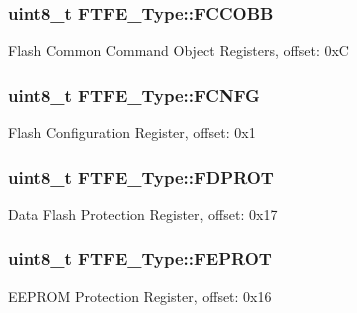 \subsubsection[{\texorpdfstring{F\+C\+C\+O\+BB}{FCCOBB}}]{ uint8\+\_\+t F\+T\+F\+E\+\_\+\+Type\+::\+F\+C\+C\+O\+BB}\hypertarget{structFTFE__Type_af938a39bf6c043725f0bd91484deddbe}{}\label{structFTFE__Type_af938a39bf6c043725f0bd91484deddbe}
Flash Common Command Object Registers, offset\+: 0xC 
\subsubsection[{\texorpdfstring{F\+C\+N\+FG}{FCNFG}}]{ uint8\+\_\+t F\+T\+F\+E\+\_\+\+Type\+::\+F\+C\+N\+FG}\hypertarget{structFTFE__Type_a82c4d1d40ee6da2a49470433428137da}{}\label{structFTFE__Type_a82c4d1d40ee6da2a49470433428137da}
Flash Configuration Register, offset\+: 0x1 
\subsubsection[{\texorpdfstring{F\+D\+P\+R\+OT}{FDPROT}}]{ uint8\+\_\+t F\+T\+F\+E\+\_\+\+Type\+::\+F\+D\+P\+R\+OT}\hypertarget{structFTFE__Type_abf8b7f6db36091a762d7602c079beed9}{}\label{structFTFE__Type_abf8b7f6db36091a762d7602c079beed9}
Data Flash Protection Register, offset\+: 0x17 
\subsubsection[{\texorpdfstring{F\+E\+P\+R\+OT}{FEPROT}}]{ uint8\+\_\+t F\+T\+F\+E\+\_\+\+Type\+::\+F\+E\+P\+R\+OT}\hypertarget{structFTFE__Type_a1f8feee14e02b9d98733f9e8ffb1d93c}{}\label{structFTFE__Type_a1f8feee14e02b9d98733f9e8ffb1d93c}
E\+E\+P\+R\+OM Protection Register, offset\+: 0x16 
